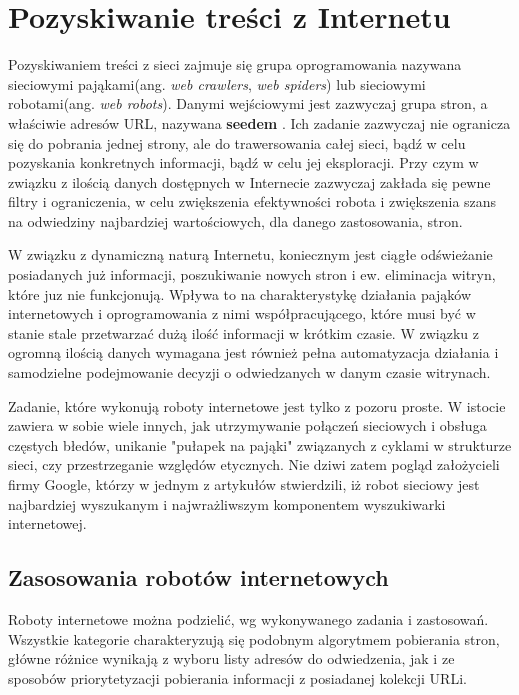 \chapter{Pozyskiwanie treści z Internetu}
\label{cha:pozyskiwanieTresci}

Pozyskiwaniem treści z sieci zajmuje się grupa oprogramowania nazywana sieciowymi pająkami(ang. \emph{web crawlers}, \emph{web spiders}) lub sieciowymi robotami(ang. \emph{web robots}). Danymi wejściowymi jest zazwyczaj grupa stron, a właściwie adresów URL, nazywana \textbf{seedem} \cite{webCrawling}. Ich zadanie zazwyczaj nie ogranicza się do pobrania jednej strony, ale do trawersowania całej sieci, bądź w celu pozyskania konkretnych informacji, bądź w celu jej eksploracji. Przy czym w związku z ilością danych dostępnych w Internecie zazwyczaj zakłada się pewne filtry i ograniczenia, w celu zwiększenia efektywności robota i zwiększenia szans na odwiedziny najbardziej wartościowych, dla danego zastosowania, stron.

W związku z dynamiczną naturą Internetu, koniecznym jest ciągłe odświeżanie posiadanych już informacji, poszukiwanie nowych stron i ew. eliminacja witryn, które juz nie funkcjonują. Wpływa to na charakterystykę działania pająków internetowych i oprogramowania z nimi współpracującego, które musi być w stanie stale przetwarzać dużą ilość informacji w krótkim czasie. W związku z ogromną ilością danych wymagana jest również pełna automatyzacja działania i samodzielne podejmowanie decyzji o odwiedzanych w danym czasie witrynach.

Zadanie, które wykonują roboty internetowe jest tylko z pozoru proste. W istocie zawiera w sobie wiele innych, jak utrzymywanie połączeń sieciowych i obsługa częstych błedów, unikanie "pułapek na pająki" związanych z cyklami w strukturze sieci, czy przestrzeganie względów etycznych. Nie dziwi zatem pogląd założycieli firmy Google, którzy w jednym z artykułów stwierdzili, iż robot sieciowy jest najbardziej wyszukanym i najwrażliwszym komponentem wyszukiwarki internetowej\cite{BrinLawrence}.


\section{Zasosowania robotów internetowych}
\label{sec:podzialRobotow}
Roboty internetowe można podzielić, wg wykonywanego zadania i zastosowań. Wszystkie kategorie charakteryzują się podobnym algorytmem pobierania stron, główne różnice wynikają z wyboru listy adresów do odwiedzenia, jak i ze sposobów priorytetyzacji pobierania informacji z posiadanej kolekcji URLi.


